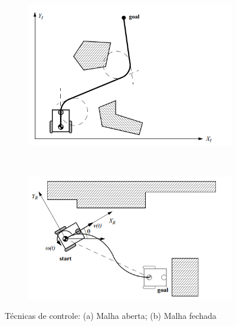 \begin{figure}[h]
    \centering
    \captionsetup{width=0.83\textwidth,font=footnotesize,textfont=bf}
    \begin{subfigure}[b]{0.4\textwidth}
        \includegraphics[width=\textwidth,height=0.25\textheight]{figuras/MalhaAberta.png}
        \caption{\centering \label{fig:Malhaaberta}}
    \end{subfigure}
    ~ 
    \begin{subfigure}[b]{0.4\textwidth}
        \includegraphics[width=\textwidth,height=0.25\textheight]{figuras/MalhaFechada.png}
        \caption{\centering \label{fig:Malhafechada}}
    \end{subfigure}
    
    \caption{\label{fig:Malhas} Técnicas de controle: (a) Malha aberta; (b) Malha fechada \cite{Intro_auto}} 
\end{figure}






